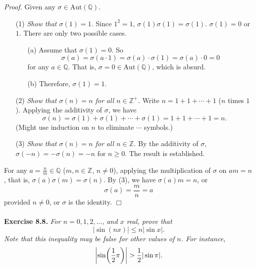 \documentclass{article}
\begin{document}
\emph{Proof.}
Given any $\sigma \in \text{Aut}(\mathbb{Q})$.
\begin{enumerate}
\item[(1)]
\emph{Show that $\sigma(1) = 1$.}
Since $1^2 = 1$, $\sigma(1)\sigma(1) = \sigma(1)$. $\sigma(1) = 0$ or $1$.
There are only two possible cases.
  \begin{enumerate}
  \item[(a)]
  Assume that $\sigma(1) = 0$. So
  $$\sigma(a) = \sigma(a \cdot 1) = \sigma(a)\cdot \sigma(1) = \sigma(a) \cdot 0 = 0$$
  for any $a \in \mathbb{Q}$.
  That is, $\sigma = 0 \in \text{Aut}(\mathbb{Q})$, which is absurd.
  \item[(b)]
  Therefore, $\sigma(1) = 1$.
  \end{enumerate}
\item[(2)]
\emph{Show that $\sigma(n) = n$ for all $n \in \mathbb{Z}^+$.}
Write $n = 1 + 1 + \cdots + 1$ ($n$ times $1$).
Applying the additivity of $\sigma$, we have
$$\sigma(n) = \sigma(1) + \sigma(1) + \cdots + \sigma(1) = 1 + 1 + \cdots + 1 = n.$$
(Might use induction on $n$ to eliminate $\cdots$ symbols.)
\item[(3)]
\emph{Show that $\sigma(n) = n$ for all $n \in \mathbb{Z}$.}
By the additivity of $\sigma$, $\sigma(-n) = -\sigma(n) = -n$ for $n \geq 0$.
The result is established.
\end{enumerate}
For any $a = \frac{n}{m} \in \mathbb{Q}$ ($m, n \in \mathbb{Z}$, $n \neq 0$),
applying the multiplication of $\sigma$ on $am = n$,
that is,
$\sigma(a) \sigma(m) = \sigma(n)$. By (3), we have $\sigma(a)m = n$,
or $$\sigma(a) = \frac{m}{n} = a$$
provided $n \neq 0$,
or $\sigma$ is the identity.
$\Box$ \\\\






\textbf{Exercise 8.8.}
\emph{For $n=0,1,2,\ldots$, and $x$ real, prove that
\[
  |\sin(nx)| \leq n |\sin x|.
\]
Note that this inequality may be false for other values of $n$.
For instance,
\[
  \abs{ \sin(\frac{1}{2} \pi) } > \frac{1}{2}|\sin \pi|.
\]} \\
\end{document}
